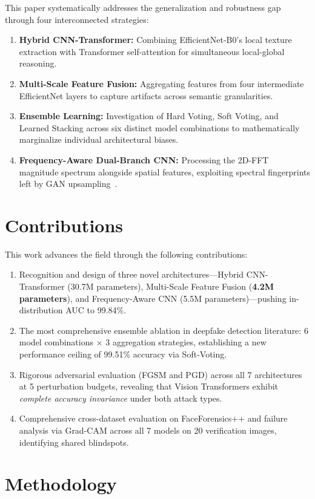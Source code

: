 \documentclass[runningheads]{llncs}
\begin{document}
This paper systematically addresses the generalization and robustness gap through four interconnected strategies:
\begin{enumerate}
    \item \textbf{Hybrid CNN-Transformer:} Combining EfficientNet-B0's local texture extraction with Transformer self-attention for simultaneous local-global reasoning.
    \item \textbf{Multi-Scale Feature Fusion:} Aggregating features from four intermediate EfficientNet layers to capture artifacts across semantic granularities.
    \item \textbf{Ensemble Learning:} Investigation of Hard Voting, Soft Voting, and Learned Stacking across six distinct model combinations to mathematically marginalize individual architectural biases.
    \item \textbf{Frequency-Aware Dual-Branch CNN:} Processing the 2D-FFT magnitude spectrum alongside spatial features, exploiting spectral fingerprints left by GAN upsampling~\cite{frequency_analysis}.
\end{enumerate}

\section{Contributions}
This work advances the field through the following contributions:
\begin{enumerate}
    \item Recognition and design of three novel architectures---Hybrid CNN-Transformer (30.7M parameters), Multi-Scale Feature Fusion (\textbf{4.2M parameters}), and Frequency-Aware CNN (5.5M parameters)---pushing in-distribution AUC to 99.84\%.
    \item The most comprehensive ensemble ablation in deepfake detection literature: 6 model combinations $\times$ 3 aggregation strategies, establishing a new performance ceiling of 99.51\% accuracy via Soft-Voting.
    \item Rigorous adversarial evaluation (FGSM and PGD) across all 7 architectures at 5 perturbation budgets, revealing that Vision Transformers exhibit \textit{complete accuracy invariance} under both attack types.
    \item Comprehensive cross-dataset evaluation on FaceForensics++ and failure analysis via Grad-CAM across all 7 models on 20 verification images, identifying shared blindspots.
\end{enumerate}

\section{Methodology}
\end{document}
